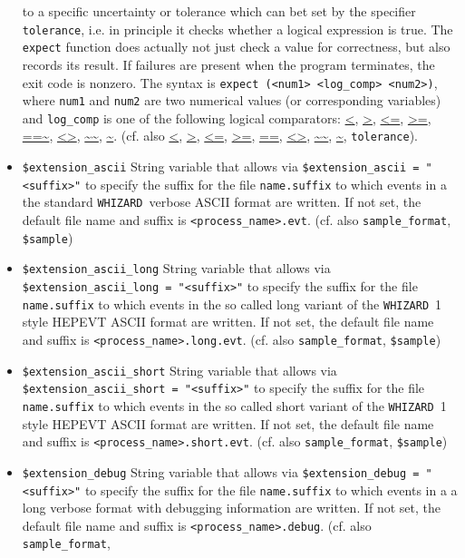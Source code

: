 \documentclass[12pt]{book}
\newcommand{\ttt}[1]{\texttt{#1}}
\newcommand{\whizard}{\texttt{WHIZARD}}
\begin{document}
\begin{itemize}
to a specific uncertainty or tolerance which can bet set by the
specifier \ttt{tolerance}, i.e. in principle it checks whether a
logical expression is true. The \ttt{expect} function does actually
not just check a value for correctness, but also records its result.
If failures are present when the program terminates, the exit code is
nonzero. The syntax is  \ttt{expect (<num1> <log\_comp> <num2>)},
where \ttt{num1} and \ttt{num2} are two numerical values (or
corresponding variables) and  \ttt{log\_comp} is one of the following
logical comparators: \url{<}, \url{>}, \url{<=},  \url{>=}, \url{==~},
\url{<>}, \url{~~}, \url{~}. 
(cf. also \url{<}, \url{>}, \url{<=},  \url{>=}, \url{==}, \url{<>},
\url{~~}, \url{~}, \ttt{tolerance}).
\item
\ttt{\$extension\_ascii} \newline
String variable that allows via \ttt{\$extension\_ascii = "<suffix>"} to 
specify the suffix for the file \ttt{name.suffix} to which events in a
the standard \whizard\ verbose ASCII format are written. If not
set, the default file name and suffix is \ttt{<process\_name>.evt}. (cf. also
\ttt{sample\_format}, \ttt{\$sample}) 
\item
\ttt{\$extension\_ascii\_long} \newline
String variable that allows via \ttt{\$extension\_ascii\_long =
  "<suffix>"} to specify the suffix for the file \ttt{name.suffix} to
which events in the so called long variant of the \whizard\ 1 style
HEPEVT ASCII format are written. If not set, the default file name and
suffix is \ttt{<process\_name>.long.evt}. (cf. also \ttt{sample\_format},
\ttt{\$sample})   
\item
\ttt{\$extension\_ascii\_short} \newline
String variable that allows via \ttt{\$extension\_ascii\_short =
  "<suffix>"} to specify the suffix for the file \ttt{name.suffix} to
which events in the so called short variant of the \whizard\ 1 style
HEPEVT ASCII format are written. If not set, the default file name and
suffix is \ttt{<process\_name>.short.evt}. (cf. also \ttt{sample\_format},
\ttt{\$sample})   
\item
\ttt{\$extension\_debug} \newline
String variable that allows via \ttt{\$extension\_debug = "<suffix>"} to 
specify the suffix for the file \ttt{name.suffix} to which events in a
a long verbose format with debugging information are written. If not
set, the default file name and suffix is
\ttt{<process\_name>.debug}. (cf. also \ttt{sample\_format},

\end{itemize}
\end{document}
